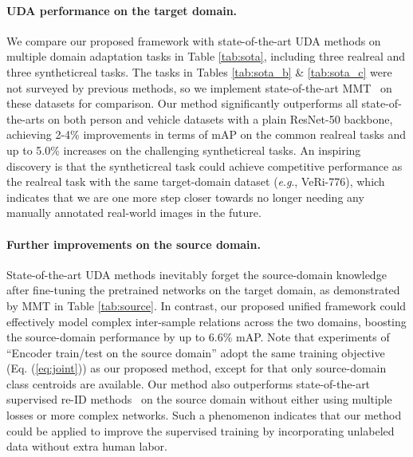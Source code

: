 \documentclass{article}
\newcommand{\eg}{\textit{e}.\textit{g}., }
\begin{document}
\paragraph{UDA performance on the target domain.}

We compare our proposed framework with state-of-the-art UDA methods on multiple domain adaptation tasks in Table \ref{tab:sota}, including three realreal and three syntheticreal tasks.
The tasks in Tables \ref{tab:sota_b} \& \ref{tab:sota_c} were not surveyed by previous methods, so we implement state-of-the-art MMT~\cite{ge2020mutual} on these datasets for comparison.
Our method significantly outperforms all state-of-the-arts on both person and vehicle datasets with a plain ResNet-50 backbone, achieving 2-4\%  improvements in terms of mAP on the common realreal tasks and up to 5.0\% increases on the challenging syntheticreal tasks.
An inspiring discovery is that the syntheticreal task could achieve competitive performance as the realreal task with the same target-domain dataset (\eg VeRi-776), which indicates that we are one more step closer towards no longer needing any manually annotated real-world images in the future.

\vspace{-5pt}
\paragraph{Further improvements on the source domain.}


State-of-the-art UDA methods inevitably forget the source-domain knowledge after fine-tuning the pretrained networks on the target domain,
as demonstrated by MMT \cite{ge2020mutual} in Table \ref{tab:source}.
In contrast, our proposed unified framework could effectively model complex inter-sample relations across the two domains, 
boosting the source-domain performance 
by up to 6.6\% mAP.
Note that experiments of ``Encoder train/test on the source domain'' adopt the same training objective (Eq. (\ref{eq:joint})) as our proposed method, except for that only source-domain class centroids  are available.
Our method also outperforms state-of-the-art supervised re-ID methods~\cite{ge2018fd,zheng2019joint,zhou2019osnet,sun2020circle} on the source domain
without either using multiple losses or more complex networks.
Such a phenomenon indicates that our method could be applied to improve the supervised training by incorporating unlabeled data without extra human labor.

\vspace{-5pt}
\end{document}
